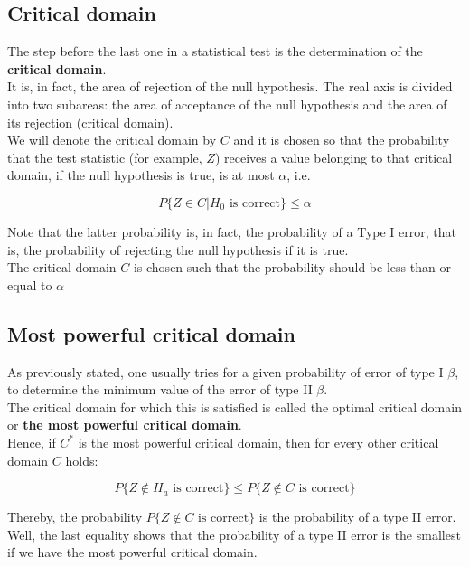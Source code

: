 \documentclass[a4paper, 12pt]{article}
\begin{document}
\subsection{Critical domain}

The step before the last one in a statistical test is the determination of the \textbf{critical domain}.\\

It is, in fact, the area of rejection of the null hypothesis. The real axis is divided into two subareas: the area of acceptance of the null hypothesis and the area of its rejection (critical domain).\\

We will denote the critical domain by $C$ and it is chosen so that the probability that the test statistic (for example, $Z$) receives a value belonging to that critical domain, if the null hypothesis is true, is at most $\alpha$, i.e.

\[ P \{  Z \in C  | H_0 \text{ is correct}\} \leq \alpha\]

Note that the latter probability is, in fact, the probability of a Type I error, that is, the probability of rejecting the null hypothesis if it is true.\\

The critical domain $C$ is chosen such that the probability should be less than or equal to $\alpha$


\subsection{Most powerful critical domain}

As previously stated, one usually tries for a given probability of error of type I $\beta$, to determine the minimum value of the error of type II $\beta$.\\

The critical domain for which this is satisfied is called the optimal critical domain or \textbf{the most powerful critical domain}.\\

Hence, if $C^*$ is the most powerful critical domain, then for every other critical domain $C$ holds:

\[ P \{ Z \notin H_a \text{ is correct} \} \leq P \{ Z \notin C \text{ is correct} \}  \]


Thereby, the probability $P \{ Z \notin C \text{ is correct} \}$ is the probability of a type II error. Well, the last equality shows that the probability of a type II error is the smallest if we have the most powerful critical domain.\\
\end{document}

